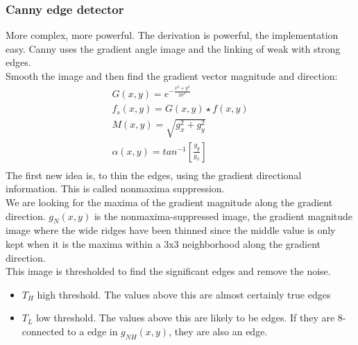 \subsubsection{Canny edge detector}
More complex, more powerful. The derivation is powerful, the implementation easy. Canny uses the gradient angle image and the linking of weak with strong edges.\\
Smooth the image and then find the gradient vector magnitude and direction:
\begin{align*}
G(x,y) = e^{-\frac{x^2+y^2}{2\sigma^2}}\\
f_s(x,y)=G(x,y)\star f(x,y)\\
M(x,y) = \sqrt{g_x^2+g_y^2}\\
\alpha(x,y) = tan^{-1}\left[\frac{g_y}{g_x}\right]\\
\end{align*}
The first new idea is, to thin the edges, using the gradient directional information. This is called nonmaxima suppression.\\
We are looking for the maxima of the gradient magnitude along the gradient direction. $g_N(x,y)$ is the nonmaxima-suppressed image, the gradient magnitude image where the wide ridges have been thinned since the middle value is only kept when it is the maxima within a 3x3 neighborhood along the gradient direction.\\
This image is thresholded to find the significant edges and remove the noise.

\begin{itemize}
\item $T_H$ high threshold. The values above this are almost certainly true edges
\item $T_L$ low threshold. The values above this are likely to be edges. If they are 8-connected to a edge in $g_{NH}(x,y)$, they are also an edge.
\end{itemize}


